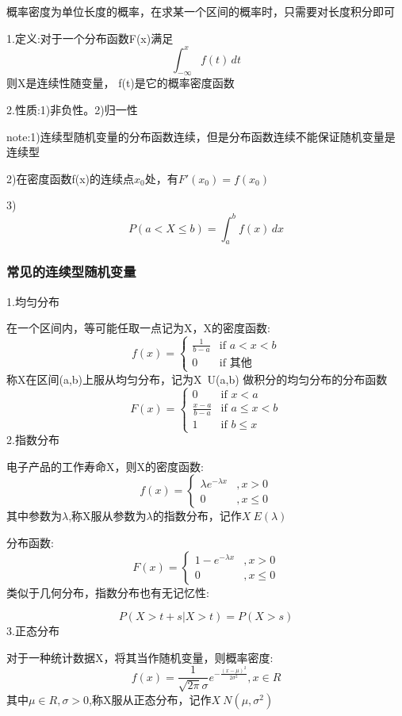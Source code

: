 \documentclass[11pt,twoside,a4paper]{ctexart}
\begin{document}
    概率密度为单位长度的概率，在求某一个区间的概率时，只需要对长度积分即可
    
    1.定义:对于一个分布函数F(x)满足
    \[\int_{-\infty}^{x}f(t)  \,dt  \]
    则X是连续性随变量， f(t)是它的概率密度函数

    2.性质:1)非负性。2)归一性

    note:1)连续型随机变量的分布函数连续，但是分布函数连续不能保证随机变量是连续型

    2)在密度函数f(x)的连续点$x_0$处，有$F'(x_0) = f(x_0)$

    3)
    \[P(a < X \leq b) = \int_{a}^{b}f(x) \,dx\]
    \subsubsection{常见的连续型随机变量}
    1.均匀分布

    在一个区间内，等可能任取一点记为X，X的密度函数:
    \[f(x) = 
    \begin{cases}
        \frac{1}{b - a} & \text{if } a<x<b \\
        0 & \text{if } \text{其他}
    \end{cases} \]
    称X在区间(a,b)上服从均匀分布，记为X~U(a,b)
    做积分的均匀分布的分布函数
    \[F(x) = 
    \begin{cases}
        0 & \text{if } x<a \\
        \frac{x-a}{b-a} & \text{if } a\leq x<b \\
        1 & \text{if } b\leq x
    \end{cases}\]
    2.指数分布

    电子产品的工作寿命X，则X的密度函数:
    \[f(x) = 
    \begin{cases}
        \lambda e^{-\lambda x} & , x > 0 \\
        0 & , x \leq 0
    \end{cases}\]
    其中参数为$\lambda $,称X服从参数为$\lambda $的指数分布，记作$X~E(\lambda )$

    分布函数:
    \[F(x) = 
    \begin{cases}
        1-e^{-\lambda x} & ,x > 0 \\
        0 & , x \leq 0
    \end{cases}\]
    类似于几何分布，指数分布也有无记忆性:

    \[P(X>t+s|X>t) = P(X>s)\]
    3.正态分布

    对于一种统计数据X，将其当作随机变量，则概率密度:
    \[f(x) = \frac{1}{\sqrt{2\pi }\sigma }e^{-\frac{(x-\mu )^2}{2\sigma ^2}}, x \in R\]
    其中$\mu \in R,\sigma >0$,称X服从正态分布，记作$X~N(\mu ,\sigma ^2)$
\end{document}
